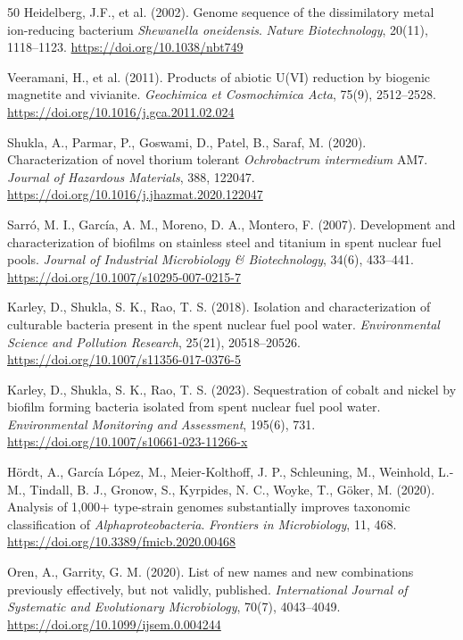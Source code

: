 \documentclass[11pt]{article}
\begin{document}
\begin{thebibliography}{50}
Heidelberg, J.F., et al. (2002).
Genome sequence of the dissimilatory metal ion-reducing bacterium
\textit{Shewanella oneidensis}.
\textit{Nature Biotechnology}, 20(11), 1118--1123.
\url{https://doi.org/10.1038/nbt749}

Veeramani, H., et al. (2011).
Products of abiotic U(VI) reduction by biogenic magnetite and vivianite.
\textit{Geochimica et Cosmochimica Acta}, 75(9), 2512--2528.
\url{https://doi.org/10.1016/j.gca.2011.02.024}

Shukla, A., Parmar, P., Goswami, D., Patel, B., Saraf, M. (2020).
Characterization of novel thorium tolerant \textit{Ochrobactrum intermedium} AM7.
\textit{Journal of Hazardous Materials}, 388, 122047.
\url{https://doi.org/10.1016/j.jhazmat.2020.122047}

Sarr\'{o}, M. I., Garc\'{i}a, A. M., Moreno, D. A., Montero, F. (2007).
Development and characterization of biofilms on stainless steel and titanium in spent nuclear
fuel pools.
\textit{Journal of Industrial Microbiology \& Biotechnology}, 34(6), 433--441.
\url{https://doi.org/10.1007/s10295-007-0215-7}

Karley, D., Shukla, S. K., Rao, T. S. (2018).
Isolation and characterization of culturable bacteria present in the spent nuclear fuel pool
water.
\textit{Environmental Science and Pollution Research}, 25(21), 20518--20526.
\url{https://doi.org/10.1007/s11356-017-0376-5}

Karley, D., Shukla, S. K., Rao, T. S. (2023).
Sequestration of cobalt and nickel by biofilm forming bacteria isolated from spent nuclear fuel
pool water.
\textit{Environmental Monitoring and Assessment}, 195(6), 731.
\url{https://doi.org/10.1007/s10661-023-11266-x}

H\"{o}rdt, A., Garc\'{i}a L\'{o}pez, M., Meier-Kolthoff, J. P., Schleuning, M., Weinhold, L.-M.,
Tindall, B. J., Gronow, S., Kyrpides, N. C., Woyke, T., G\"{o}ker, M. (2020).
Analysis of 1,000+ type-strain genomes substantially improves taxonomic classification of
\textit{Alphaproteobacteria}.
\textit{Frontiers in Microbiology}, 11, 468.
\url{https://doi.org/10.3389/fmicb.2020.00468}

Oren, A., Garrity, G. M. (2020).
List of new names and new combinations previously effectively, but not validly, published.
\textit{International Journal of Systematic and Evolutionary Microbiology}, 70(7), 4043--4049.
\url{https://doi.org/10.1099/ijsem.0.004244}


\end{thebibliography}
\end{document}
